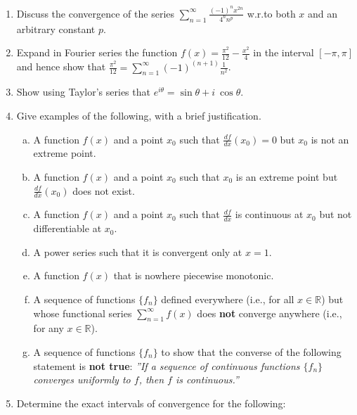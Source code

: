 \documentclass[journal,12pt,twocolumn]{IEEEtran}
\begin{document}
\begin{enumerate}
\item Discuss the convergence of the series $\sum\limits_{n=1}^{\infty} \frac{(-1)^n x^{2n}}{4^n n^p}$ w.r.to both $x$ and an arbitrary constant $p$. 

\item Expand in Fourier series the function $f(x) =\frac{\pi^2}{12}-\frac{x^2}{4}$ in the interval $[-\pi,\pi]$ and hence show that
$\frac{\pi^2}{12}=\sum\limits_{n=1}^{\infty} (-1)^{(n+1)} \frac{1}{n^2}$.

\item Show using Taylor’s series that $e^{i\theta} = \sin\theta + i \ \cos\theta$. 


\item Give examples of the following, with a brief justification. 
\setlength\itemsep{2em}
\begin{enumerate}[(a)]
\item A function $f(x)$ and a point $x_0$ such that $\frac{df}{dx}(x_0)=0$ but $x_0$ is not an extreme point.

\item A function $f(x)$ and a point $x_0$ such that $x_0$ is an extreme point but $\frac{df}{dx}(x_0)$ does not exist.


\item A function $f(x)$ and a point $x_0$ such that $\frac{df}{dx}$ is continuous at $x_0$ but not differentiable at $x_0$.

\item A power series such that it is convergent only at $x = 1$.
\item A function $f(x)$ that is nowhere piecewise monotonic.
\item A sequence of functions $\lbrace f_n \rbrace$ defined everywhere (i.e., for all $x \in \mathbb{R}$) but whose functional series $ \sum_{n=1}^{\infty} f(x)$ does \textbf{not} converge anywhere (i.e., for any $x \in \mathbb{R}$).
\item A sequence of functions $\lbrace f_n \rbrace$ to show that the converse of the following statement is \textbf{not true}:
\textit{”If a sequence of continuous functions $\lbrace f_n \rbrace$ converges uniformly to $f$, then $f$ is continuous.”}

\end{enumerate}

\item Determine the exact intervals of convergence for the following:


\begin{enumerate}[(i)]
\begin{multicols}{2}
\setlength\itemsep{2em}


\end{multicols}
\end{enumerate}
\end{enumerate}
\end{document}
